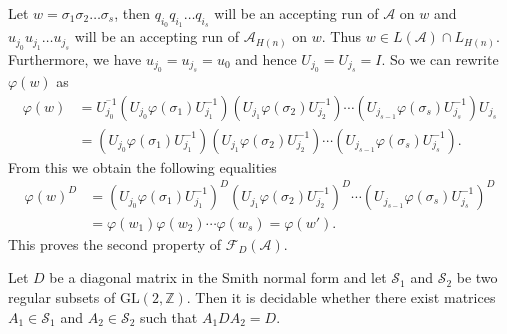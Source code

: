 \documentclass[fontsize=11pt,DIV=13,paper=letter]{scrartcl}
\theoremstyle{definition}
\newcommand{\A}{\mathcal{A}}
\newcommand{\Z}{\mathbb{Z}}
\newcommand{\F}{\mathcal{F}}
\newcommand{\s}{\mathcal{S}}
\newcommand{\GL}{\mathrm{GL}(2,\Z)}
\renewcommand{\phi}{\varphi}
\begin{document}
Let $w=\sigma_1\sigma_2\dots \sigma_s$, then $q_{i_0}q_{i_1}\dots q_{i_s}$ will be an accepting run of $\A$ on $w$ and $u_{j_0}u_{j_1}\dots u_{j_s}$ will be an accepting run of $\A_{H(n)}$ on $w$. Thus $w\in L(\A)\cap L_{H(n)}$. Furthermore, we have $u_{j_0}=u_{j_s}=u_0$ and hence $U_{j_0}=U_{j_s}=I$. So we can rewrite $\phi(w)$ as
\[
\begin{split}
\phi(w) &= U^{^-1}_{j_0}(U^{}_{j_0}\phi(\sigma_1)U_{j_1}^{-1})(U^{}_{j_1}\phi(\sigma_2)U_{j_2}^{-1})\cdots (U^{}_{j_{s-1}}\phi(\sigma_s)U_{j_s}^{-1})U^{}_{j_s}\\
&= (U^{}_{j_0}\phi(\sigma_1)U_{j_1}^{-1})(U^{}_{j_1}\phi(\sigma_2)U_{j_2}^{-1})\cdots (U^{}_{j_{s-1}}\phi(\sigma_s)U_{j_s}^{-1}).
\end{split}
\]
From this we obtain the following equalities
\[
\begin{split}
\phi(w)^D &= (U^{}_{j_0}\phi(\sigma_1)U_{j_1}^{-1})^D(U^{}_{j_1}\phi(\sigma_2)U_{j_2}^{-1})^D\cdots (U^{}_{j_{s-1}}\phi(\sigma_s)U_{j_s}^{-1})^D\\ &= \phi(w_1)\phi(w_2) \cdots \phi(w_s) = \phi(w').
\end{split}
\]
This proves the second property of $\F_D(\A)$.


\begin{proposition}\label{prop:1diag}
Let $D$ be a diagonal matrix in the Smith normal form and let $\s_1$ and $\s_2$ be two regular subsets of $\GL$. Then it is decidable whether there exist matrices $A_1\in \s_1$ and $A_2\in \s_2$ such that $A_1DA_2=D$.
\end{proposition}
\end{document}
